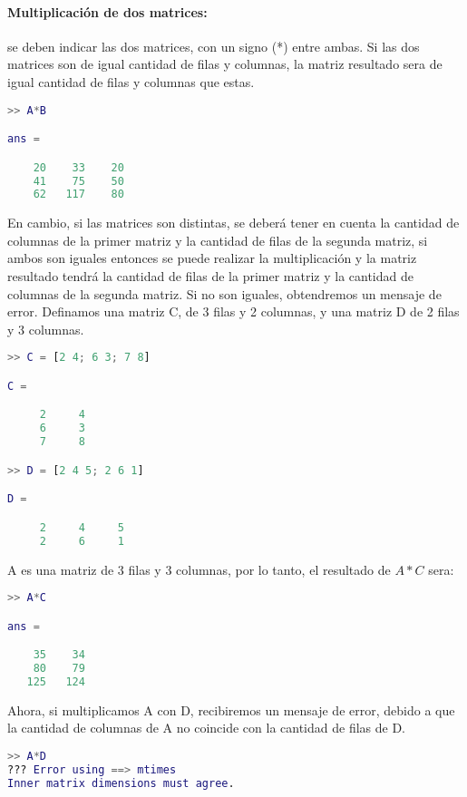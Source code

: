 \paragraph{Multiplicación de dos matrices:} se deben indicar las dos matrices, con un signo (*) entre ambas. Si las dos matrices son de igual cantidad de filas y columnas, la matriz resultado sera de igual cantidad de filas y columnas que estas.
\begin{lstlisting}[language=Matlab]
>> A*B

ans =

    20    33    20
    41    75    50
    62   117    80

\end{lstlisting}

En cambio, si las matrices son distintas, se deberá tener en cuenta la cantidad de columnas de la primer matriz y la cantidad de filas de la segunda matriz, si ambos son iguales entonces se puede realizar la multiplicación y la matriz resultado tendrá la cantidad de filas de la primer matriz y la cantidad de columnas de la segunda matriz. Si no son iguales, obtendremos un mensaje de error. Definamos una matriz C, de 3 filas y 2 columnas, y una matriz D de 2 filas y 3 columnas.

\begin{lstlisting}[language=Matlab]
>> C = [2 4; 6 3; 7 8]

C =

     2     4
     6     3
     7     8

>> D = [2 4 5; 2 6 1]

D =

     2     4     5
     2     6     1

\end{lstlisting}

A es una matriz de 3 filas y 3 columnas, por lo tanto, el resultado de $A*C$ sera:
\begin{lstlisting}[language=Matlab]
>> A*C

ans =

    35    34
    80    79
   125   124

\end{lstlisting}

Ahora, si multiplicamos A con D, recibiremos un mensaje de error, debido a que la cantidad de columnas de A no coincide con la cantidad de filas de D.
\begin{lstlisting}[language=Matlab]
>> A*D
??? Error using ==> mtimes
Inner matrix dimensions must agree.
 
\end{lstlisting}

